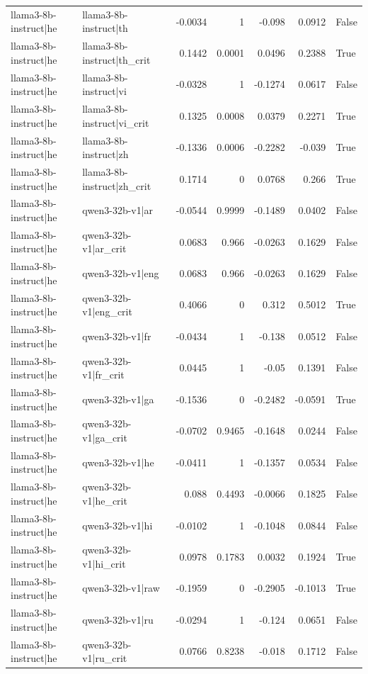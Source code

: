 \begin{table}
\begin{tabular}{l l r r r r l}
llama3-8b-instruct|he & llama3-8b-instruct|th & -0.0034 & 1 & -0.098 & 0.0912 & False \\
llama3-8b-instruct|he & llama3-8b-instruct|th_crit & 0.1442 & 0.0001 & 0.0496 & 0.2388 & True \\
llama3-8b-instruct|he & llama3-8b-instruct|vi & -0.0328 & 1 & -0.1274 & 0.0617 & False \\
llama3-8b-instruct|he & llama3-8b-instruct|vi_crit & 0.1325 & 0.0008 & 0.0379 & 0.2271 & True \\
llama3-8b-instruct|he & llama3-8b-instruct|zh & -0.1336 & 0.0006 & -0.2282 & -0.039 & True \\
llama3-8b-instruct|he & llama3-8b-instruct|zh_crit & 0.1714 & 0 & 0.0768 & 0.266 & True \\
llama3-8b-instruct|he & qwen3-32b-v1|ar & -0.0544 & 0.9999 & -0.1489 & 0.0402 & False \\
llama3-8b-instruct|he & qwen3-32b-v1|ar_crit & 0.0683 & 0.966 & -0.0263 & 0.1629 & False \\
llama3-8b-instruct|he & qwen3-32b-v1|eng & 0.0683 & 0.966 & -0.0263 & 0.1629 & False \\
llama3-8b-instruct|he & qwen3-32b-v1|eng_crit & 0.4066 & 0 & 0.312 & 0.5012 & True \\
llama3-8b-instruct|he & qwen3-32b-v1|fr & -0.0434 & 1 & -0.138 & 0.0512 & False \\
llama3-8b-instruct|he & qwen3-32b-v1|fr_crit & 0.0445 & 1 & -0.05 & 0.1391 & False \\
llama3-8b-instruct|he & qwen3-32b-v1|ga & -0.1536 & 0 & -0.2482 & -0.0591 & True \\
llama3-8b-instruct|he & qwen3-32b-v1|ga_crit & -0.0702 & 0.9465 & -0.1648 & 0.0244 & False \\
llama3-8b-instruct|he & qwen3-32b-v1|he & -0.0411 & 1 & -0.1357 & 0.0534 & False \\
llama3-8b-instruct|he & qwen3-32b-v1|he_crit & 0.088 & 0.4493 & -0.0066 & 0.1825 & False \\
llama3-8b-instruct|he & qwen3-32b-v1|hi & -0.0102 & 1 & -0.1048 & 0.0844 & False \\
llama3-8b-instruct|he & qwen3-32b-v1|hi_crit & 0.0978 & 0.1783 & 0.0032 & 0.1924 & True \\
llama3-8b-instruct|he & qwen3-32b-v1|raw & -0.1959 & 0 & -0.2905 & -0.1013 & True \\
llama3-8b-instruct|he & qwen3-32b-v1|ru & -0.0294 & 1 & -0.124 & 0.0651 & False \\
llama3-8b-instruct|he & qwen3-32b-v1|ru_crit & 0.0766 & 0.8238 & -0.018 & 0.1712 & False \\

\end{tabular}
\end{table}

